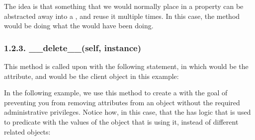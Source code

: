\documentclass[a4paper,10pt,english]{sphinxmanual}
\begin{document}
The idea is that something that we would normally place in a property can be abstracted
away into a , and reuse it multiple times. In this case, the  method
would be doing what the  would have been doing.


\subsubsection{1.2.3. \_\_delete\_\_(self, instance)}
\label{\detokenize{chapters/6_descriptors/index:delete-self-instance}}
This method is called upon with the following statement, in which  would be the
 attribute, and  would be the client object in this example:

\begin{sphinxVerbatim}[commandchars=\\\{\}]
 
\end{sphinxVerbatim}

In the following example, we use this method to create a  with the goal of
preventing you from removing attributes from an object without the required
administrative privileges. Notice how, in this case, that the  has logic that is
used to predicate with the values of the object that is using it, instead of different related
objects:
\end{document}
